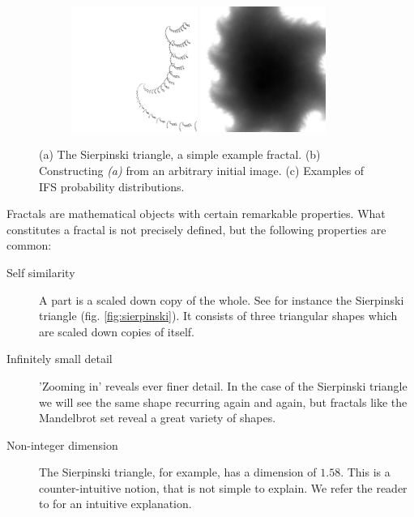 \documentclass[10pt,a4paper,oneside]{article}
\theoremstyle{definition}
\begin{document}
\begin{figure}[b]
\begin{subfigure}[b]{0.3\textwidth}
    \includegraphics[width=0.45\textwidth]{../img/random010.png}
    \includegraphics[width=0.45\textwidth]{../img/mvn1k.png}
    \caption{}
  \end{subfigure}
  \caption{\small (a) The Sierpinski triangle, a simple example fractal. (b) Constructing \textit{(a)} from an arbitrary initial image. (c) Examples of IFS probability distributions.}
  \label{fig:examples}
\end{figure}

Fractals are mathematical objects with certain remarkable properties. What constitutes a fractal is not precisely defined\footnotemark, but the following properties are common:

\begin{description}
  \item[Self similarity] A part is a scaled down copy of the whole. See for instance the Sierpinski triangle (fig. \ref{fig:sierpinski}). It consists of three triangular shapes which are scaled down copies of itself.
  \item[Infinitely small detail] 'Zooming in' reveals ever finer detail. In the case of the Sierpinski triangle we will see the same shape recurring again and again, but fractals like the Mandelbrot set reveal a great variety of shapes.
  \item[Non-integer dimension] The Sierpinski triangle, for example, has a dimension of $1.58$. This is a counter-intuitive notion, that is not simple to explain. We refer the reader to \cite{schroeder2009fractals} for an intuitive explanation.
\end{description}
\end{document}
